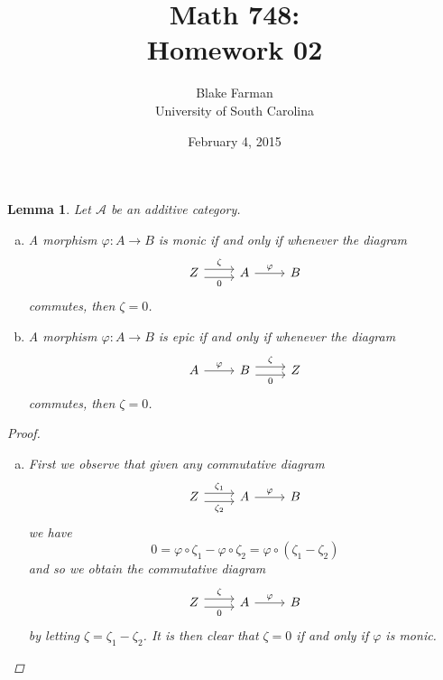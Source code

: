 \documentclass[10pt]{amsart}
\author{Blake Farman\\University of South Carolina}
\title{Math 748:\\Homework 02}
\date{February 4, 2015}
\begin{document}
\maketitle

\providecommand{\p}{\mathfrak{p}}
\providecommand{\m}{\mathfrak{m}}
\providecommand{\Deck}[1]{\operatorname{Deck}\left(#1\right)}
\newtheorem{thm}{}
\newtheorem{lem}{Lemma}
\newtheorem{prop}{Proposition}
\theoremstyle{definition}
\newtheorem{defn}{Definition}[thm]

\newcommand{\A}{\mathbb{A}}

\begin{lem}\label{lem1}
  Let $\mathcal{A}$ be an additive category.
  \begin{enumerate}[(a)]
  \item
    A morphism $\varphi: A \rightarrow B$ is monic if and only if whenever the diagram
    $$\begin{tikzcd}
      Z \arrow[shift left = 0.75ex]{r}{\zeta} \arrow[shift right=0.75ex, swap]{r}{0}& A\arrow{r}{\varphi} & B
    \end{tikzcd}
    $$
    commutes, then $\zeta = 0$.
  \item
    A morphism $\varphi: A \rightarrow B$ is epic if and only if whenever the diagram
    $$\begin{tikzcd}
      A\arrow{r}{\varphi} & B \arrow[shift left = 0.75ex]{r}{\zeta} \arrow[shift right=0.75ex, swap]{r}{0} & Z
    \end{tikzcd}
    $$
    commutes, then $\zeta = 0$.
  \end{enumerate}
  \begin{proof}
    \begin{enumerate}[(a)]
    \item
      First we observe that given any commutative diagram
      $$\begin{tikzcd}
	Z \arrow[shift left = 0.75ex]{r}{\zeta_1} \arrow[shift right=0.75ex, swap]{r}{\zeta_2}& A\arrow{r}{\varphi} & B
      \end{tikzcd}$$
      we have
      $$0 = \varphi \circ \zeta_1 - \varphi \circ \zeta_2 = \varphi \circ (\zeta_1 - \zeta_2)$$
      and so we obtain the commutative diagram
      $$\begin{tikzcd}
	Z \arrow[shift left = 0.75ex]{r}{\zeta} \arrow[shift right=0.75ex, swap]{r}{0}& A\arrow{r}{\varphi} & B
      \end{tikzcd}$$
      by letting $\zeta = \zeta_1 - \zeta_2$.
      It is then clear that $\zeta = 0$ if and only if $\varphi$ is monic.

\end{enumerate}
\end{proof}
\end{lem}
\end{document}
